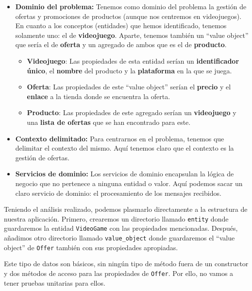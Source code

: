 \begin{itemize}
    \item \textbf{Dominio del problema:} Tenemos como dominio del problema la 
    gestión de ofertas y promociones de productos (aunque nos centremos en 
    videojuegos). En cuanto a los conceptos (entidades) que hemos identificado, 
    tenemos solamente uno: el de \textbf{videojuego}. Aparte, tenemos también un 
    ``value object'' que sería el de \textbf{oferta} y un agregado de ambos que es 
    el de \textbf{producto}.
    \begin{itemize}
        \item \textbf{Videojuego}: Las propiedades de esta entidad serían un 
        \textbf{identificador único}, el \textbf{nombre} del producto y la 
        \textbf{plataforma} en la que se juega.
        \item \textbf{Oferta}: Las propiedades de este ``value object'' serían el 
        \textbf{precio} y el \textbf{enlace} a la tienda donde se encuentra la 
        oferta.
        \item \textbf{Producto}: Las propiedades de este agregado serían un 
        \textbf{videojuego} y una \textbf{lista de ofertas} que se han encontrado 
        para este.
    \end{itemize}
    \item \textbf{Contexto delimitado:} Para centrarnos en el problema, tenemos que 
    delimitar el contexto del mismo. Aquí tenemos claro que el contexto es la 
    gestión de ofertas.
    \item \textbf{Servicios de dominio:} Los servicios de dominio encapsulan la 
    lógica de negocio que no pertenece a ninguna entidad o valor. Aquí podemos sacar 
    un claro servicio de dominio: el procesamiento de los mensajes recibidos.
\end{itemize}

Teniendo el análisis realizado, podemos plasmarlo directamente a la estructura de 
nuestra aplicación. Primero, crearemos un directorio llamado \verb|entity| donde 
guardaremos la entidad \verb|VideoGame| con las propiedades mencionadas. Después, 
añadimos otro directorio llamado \verb|value_object| donde guardaremos el ``value 
object'' de \verb|Offer| también con sus propiedades apropiadas.

Este tipo de datos son básicos, sin ningún tipo de método fuera de un constructor y 
dos métodos de acceso para las propiedades de \verb|Offer|. Por ello, no vamos a 
tener pruebas unitarias para ellos.

